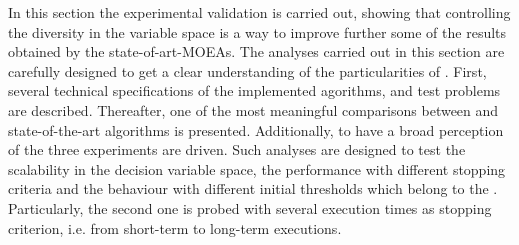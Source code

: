 In this section the experimental validation is carried out, showing that controlling the diversity in the variable space is a way to improve further some of the results obtained by the state-of-art-MOEAs.
%
The analyses carried out in this section are carefully designed to get a clear understanding of the particularities of \VSDMOEA{}.
%
First, several technical specifications of the implemented agorithms, and test problems are described.
%
Thereafter, one of the most meaningful comparisons between \VSDMOEA{} and state-of-the-art algorithms is presented.
%
Additionally, to have a broad perception of the \VSDMOEA{} three experiments are driven.
%
Such analyses are designed to test the scalability in the decision variable space, the performance with different stopping criteria and the behaviour with different initial thresholds which belong to the \VSDMOEA{}.
%
Particularly, the second one is probed with several execution times as stopping criterion, i.e. from short-term to long-term executions.


%
%
%
%
%
%
%
%
%

